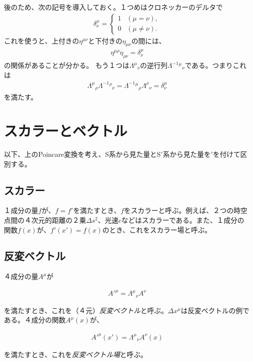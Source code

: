 \documentclass[report,paper=a4, fontsize=12pt, line_length=16cm, number_of_lines=33,dvipdfmx]{jlreq}
\newenvironment{important}{\begin{tcolorbox}[
  colback = white,
  colframe = red!35,
  boxrule = 2mm,
  fonttitle = \bfseries,
  after = \noindent] }{\end{tcolorbox}}
\numberwithin{equation}{chapter}
\newcommand{\Sp}{S$'$}
\begin{document}
後のため、次の記号を導入しておく。１つめはクロネッカーのデルタで
\begin{align}
\delta^{\mu}_{\nu}
=
\begin{cases}
1&(\mu=\nu),\\
0 &(\mu\ne\nu).
\end{cases}
\end{align}
これを使うと、上付きの$\eta^{\mu\nu}$と下付きの$\eta_{\mu\nu}$の間には、
\begin{align}
\eta^{\mu\rho}\eta_{\rho\nu}=\delta^{\mu}_{\nu}
\end{align}
の関係があることが分かる。
もう１つは$\Lambda^{\mu}{}_{\nu}$の逆行列$\Lambda^{-1}{}^{\mu}{}_{\nu}$である。つまりこれは
\begin{align}
\Lambda^{\mu}{}_{\rho}\Lambda^{-1}{}^{\rho}{}_{\nu}=\Lambda^{-1}{}^{\mu}{}_{\rho}\Lambda^{\rho}{}_{\nu}=\delta^{\mu}_{\nu}
\end{align}
を満たす。
\section{スカラーとベクトル}
以下、上のPoincare変換を考え、S系から見た量と\Sp 系から見た量を$'$を付けて区別する。

\subsection{スカラー}
１成分の量$f$が、$f=f'$を満たすとき、$f$をスカラーと呼ぶ。例えば、２つの時空点間の４次元的距離の２乗$\Delta s^{2}$、光速$c$などはスカラーである。また、１成分の関数$f(x)$が、$f'(x')=f(x)$のとき、これをスカラー場と呼ぶ。

\subsection{反変ベクトル}
４成分の量$A^{\mu}$が
\begin{important}
\begin{align}
A'^{\mu}=\Lambda^{\mu}{}_{\nu}A^{\nu}
\end{align}
\end{important}
を満たすとき、これを（４元）\emph{反変ベクトル}と呼ぶ。$\Delta x^{\mu}$は反変ベクトルの例である。４成分の関数$A^{\mu}(x)$が、
\begin{important}
\begin{align}
A'^{\mu}(x')=\Lambda^{\mu}{}_{\nu}A^{\nu}(x)
\end{align}
\end{important}
を満たすとき、これを\emph{反変ベクトル場}と呼ぶ。
\end{document}
